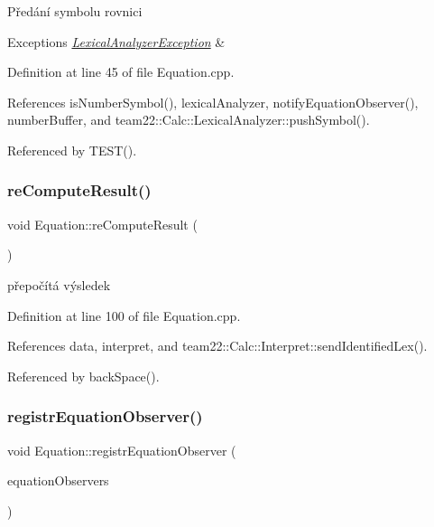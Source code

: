 Předání symbolu rovnici 
\begin{DoxyExceptions}{Exceptions}
{\em \hyperlink{classteam22_1_1_calc_1_1_lexical_analyzer_exception}{Lexical\+Analyzer\+Exception}} & \\
\hline
\end{DoxyExceptions}


Definition at line 45 of file Equation.\+cpp.



References is\+Number\+Symbol(), lexical\+Analyzer, notify\+Equation\+Observer(), number\+Buffer, and team22\+::\+Calc\+::\+Lexical\+Analyzer\+::push\+Symbol().



Referenced by T\+E\+S\+T().

\mbox{\label{classteam22_1_1_calc_1_1_equation_aba44b10dfb0ece96f3e0279d34cec868}} 
\subsubsection{\texorpdfstring{re\+Compute\+Result()}{reComputeResult()}}
{\footnotesize\ttfamily void Equation\+::re\+Compute\+Result (\begin{DoxyParamCaption}{ }\end{DoxyParamCaption})\hspace{0.3cm}{\ttfamily [private]}}

přepočítá výsledek 

Definition at line 100 of file Equation.\+cpp.



References data, interpret, and team22\+::\+Calc\+::\+Interpret\+::send\+Identified\+Lex().



Referenced by back\+Space().

\mbox{\label{classteam22_1_1_calc_1_1_equation_a705c26d64f67f673e4919494d7e22d4a}} 
\subsubsection{\texorpdfstring{registr\+Equation\+Observer()}{registrEquationObserver()}}
{\footnotesize\ttfamily void Equation\+::registr\+Equation\+Observer (\begin{DoxyParamCaption}\item[{\hyperlink{classteam22_1_1_calc_1_1_equation_observer}{Equation\+Observer} $\ast$}]{equation\+Observers }\end{DoxyParamCaption})}

